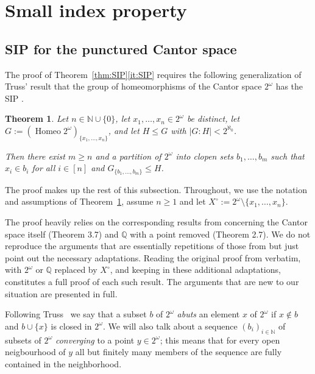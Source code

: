 \documentclass[12pt,a4paper,reqno]{amsart}
\numberwithin{equation}{section}
\theoremstyle{plain}
\newtheorem{thm}{Theorem}[section]
\theoremstyle{definition}
\newcommand{\N}{\mathbb{N}}
\DeclareMathOperator{\Homeo}{Homeo}
\begin{document}
\section{Small index property} \label{sec:SIP}

\subsection{SIP for the punctured Cantor space}

 The proof of Theorem~\ref{thm:SIP}\eqref{it:SIP} requires the following generalization of Truss' result that the
 group of homeomorphisms of the Cantor space $2^\omega$ has the SIP \cite[Theorem 3.7]{Tr:IPG2}.

\begin{thm} \label{thm:Truss}
 Let $n\in\N\cup\{0\}$, let $x_1,\dots,x_n\in 2^\omega$ be distinct, let $G := (\Homeo 2^\omega)_{\{x_1,\dots,x_n\}}$,
 and let $H\leq G$ with $|G:H| < 2^{\aleph_0}$.  
 
 Then there exist $m\geq n$ and a partition of $2^\omega$ into clopen sets
 $b_1,\dots,b_m$ such that $x_i\in b_i$ for all $i\in [n]$ and $G_{\{b_1,\dots,b_m\}} \leq H$.
\end{thm}

 The proof makes up the rest of this subsection.
 Throughout,  we use the notation and assumptions of Theorem~\ref{thm:Truss}, assume $n\geq 1$ and let
$X^\circ := 2^\omega\setminus\{x_1,\dots,x_n\}$.
 
 
 The proof heavily relies on the corresponding results from \cite{Tr:IPG2} concerning the Cantor space itself (Theorem 3.7)
 and $\mathbb{Q}$ with a point removed (Theorem 2.7).
 We do not reproduce the arguments that are essentially repetitions of those from \cite{Tr:IPG2} but
 just point out the necessary adaptations.
 Reading the original proof from \cite{Tr:IPG2} verbatim, with $2^\omega$ or $\mathbb{Q}$ replaced by
 $X^\circ$, and keeping in these additional adaptations, constitutes a full proof of each such result.
 The arguments that are new to our situation are presented in full.


 Following Truss~\cite{Tr:IPG1,Tr:IPG2} we say that a subset $b$ of $2^\omega$ \emph{abuts} an element $x$ of $2^\omega$ if
 $x\not\in b$ and $b\cup\{x\}$ is closed in $2^\omega$.
 We will also talk about a sequence $(b_i)_{i\in\N}$ of subsets of $2^\omega$ \emph{converging} to a point $y\in 2^\omega$; this means that for every open neigbourhood of $y$ all but finitely many members of the sequence are fully contained in the neighborhood.
 
\end{document}
